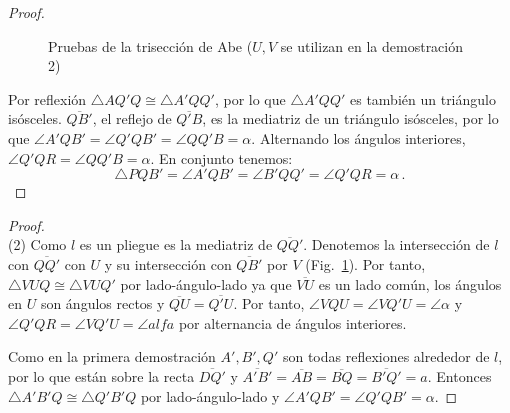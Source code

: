 \begin{proof}
\begin{figure}[t]
\begin{center}
\end{center}
\caption{Pruebas de la trisección de Abe ($U,V$ se utilizan en la demostración 2)}\label{f.abe2}
\end{figure}

Por reflexión $\triangle AQ'Q\cong \triangle A'QQ'$, por lo que $\triangle A'QQ'$ es también un triángulo isósceles.
$\overline{QB'}$, el reflejo de $\overline{Q'B}$, es la mediatriz de un triángulo isósceles, por lo que $\angle A'QB'=\angle Q'QB'=\angle QQ'B=\alpha$.
Alternando los ángulos interiores, $\angle Q'QR=\angle QQ'B=\alpha$.
En conjunto tenemos:
\[
\triangle PQB'=\angle A'QB'=\angle B'QQ'=\angle Q'QR=\alpha\,.
\]
\end{proof}

\begin{proof}
\mbox{}\\
(2)
Como $l$ es un pliegue es la mediatriz de $\overline{QQ'}$. Denotemos la intersección de $l$ con $\overline{QQ'}$ con $U$ y su intersección con $\overline{QB'}$ por $V$ (Fig.~\ref{f.abe2}). Por tanto, $\triangle VUQ\cong \triangle VUQ'$ por lado-ángulo-lado ya que $\overline{VU}$ es un lado común, los ángulos en $U$ son ángulos rectos y $\overline{QU}=\overline{Q'U}$. Por tanto, $\angle VQU=\angle VQ'U=\angle \alpha$ y $\angle Q'QR=\angle VQ'U=\angle alfa$ por alternancia de ángulos interiores.

Como en la primera demostración $A', B', Q'$ son todas reflexiones alrededor de $l$, por lo que están sobre la recta $\overline{DQ'}$ y $\overline{A'B'}=\overline{AB}=\overline{BQ}=\overline{B'Q'}=a$. Entonces $\triangle A'B'Q\cong\triangle Q'B'Q$ por lado-ángulo-lado y $\angle A'QB'=\angle Q'QB'=\alpha$.
\end{proof}


